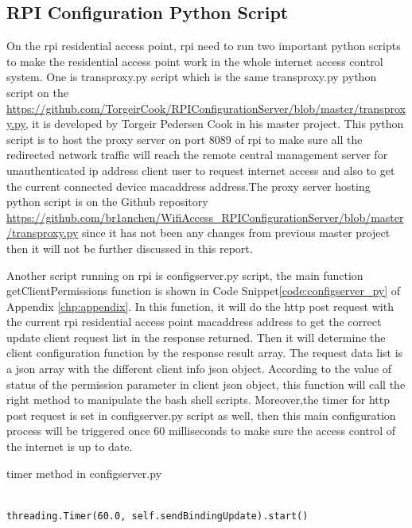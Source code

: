 \subsection{RPI Configuration Python Script}
\par On the \gls{rpi} residential access point, \gls{rpi} need to run two important python scripts to make the residential access point work in the whole internet access control system. One is transproxy.py script which is the same transproxy.py python script on the \url{https://github.com/TorgeirCook/RPIConfigurationServer/blob/master/transproxy.py}, it is developed by Torgeir Pedersen Cook in his master project. This python script is to host the proxy server on port 8089 of \gls{rpi} to make sure all the redirected network traffic will reach the remote central management server for unauthenticated \gls{ip} address client user to request internet access and also to get the current connected device \gls{macaddress} address.The proxy server hosting python script is on the Github repository \url{https://github.com/br1anchen/WifiAccess_RPIConfigurationServer/blob/master/transproxy.py} since it has not been any changes from previous master project then it will not be further discussed in this report.
\par Another script running on \gls{rpi} is configserver.py script, the main function getClientPermissions function is shown in Code Snippet\ref{code:configserver_py} of Appendix \ref{chp:appendix}. In this function, it will do the \gls{http} post request with the current \gls{rpi} residential access point \gls{macaddress} address to get the correct update client request list in the response returned. Then it will determine the client configuration function by the response result array. The request data list is a \gls{json} array with the different client info \gls{json} object. According to the value of status of the permission parameter in client \gls{json} object, this function will call the right method to manipulate the bash shell scripts. Moreover,the timer for \gls{http} post request is set in configserver.py script as well, then this main configuration process will be triggered once 60 milliseconds to make sure the access control of the internet is up to date.
\begin{algorithm}[h]
  \caption{timer method in configserver.py}
  \label{code:timer_configserver}
  \begin{verbatim}
  
threading.Timer(60.0, self.sendBindingUpdate).start()
 \end{verbatim}
\end{algorithm}

